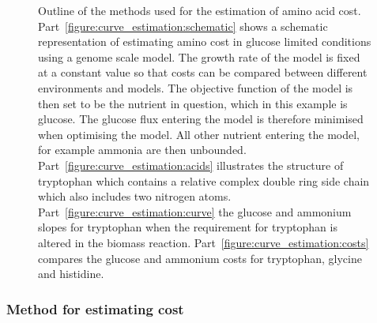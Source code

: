 \begin{figure}
  \hfill
  \hfill
  \hfill
  \hfill
  \caption[Methods used for estimation of amino acid cost]{Outline of the methods used for the estimation of amino acid cost. Part~\ref{figure:curve_estimation:schematic} shows a schematic representation of estimating amino cost in glucose limited conditions using a genome scale model. The growth rate of the model is fixed at a constant value so that costs can be compared  between different environments and models. The objective function of the model is then set to be the nutrient in question, which in this example is glucose. The glucose flux entering the model is therefore minimised when optimising the model. All other nutrient entering the model, for example ammonia are then unbounded. Part~\ref{figure:curve_estimation:acids} illustrates the structure of tryptophan which contains a relative complex double ring side chain which also includes two nitrogen atoms. Part~\ref{figure:curve_estimation:curve} the glucose and ammonium slopes for tryptophan when the requirement for tryptophan is altered in the biomass reaction. Part~\ref{figure:curve_estimation:costs} compares the glucose and ammonium costs for tryptophan, glycine and histidine. }
  \label{figure:curve_estimation}
\end{figure}

\subsubsection{Method for estimating cost}

